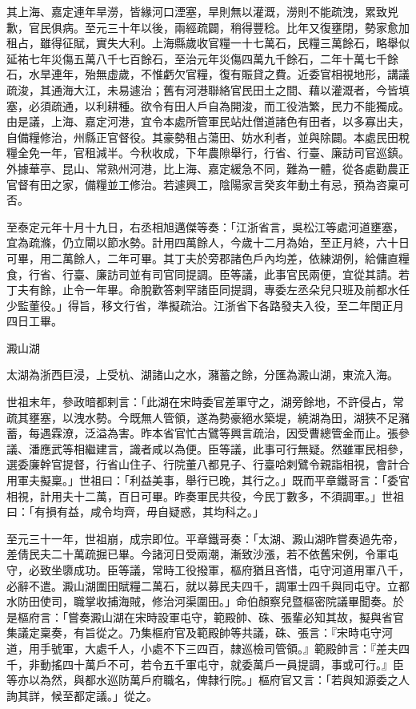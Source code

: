 \begin{pinyinscope}
 其上海、嘉定連年旱澇，皆緣河口湮塞，旱則無以灌溉，澇則不能疏洩，累致兇歉，官民俱病。至元三十年以後，兩經疏闢，稍得豐稔。比年又復壅閉，勢家愈加租占，雖得征賦，實失大利。上海縣歲收官糧一十七萬石，民糧三萬餘石，略舉似延祐七年災傷五萬八千七百餘石，至治元年災傷四萬九千餘石，二年十萬七千餘石，水旱連年，殆無虛歲，不惟虧欠官糧，復有賑貸之費。近委官相視地形，講議疏浚，其通海大江，未易遽治；舊有河港聯絡官民田土之間、藉以灌溉者，今皆填塞，必須疏通，以利耕種。欲令有田人戶自為開浚，而工役浩繁，民力不能獨成。由是議，上海、嘉定河港，宜令本處所管軍民站灶僧道諸色有田者，以多寡出夫，自備糧修治，州縣正官督役。其豪勢租占蕩田、妨水利者，並與除闢。本處民田稅糧全免一年，官租減半。今秋收成，下年農隙舉行，行省、行臺、廉訪司官巡鎮。外據華亭、昆山、常熟州河港，比上海、嘉定緩急不同，難為一體，從各處勸農正官督有田之家，備糧並工修治。若遽興工，陰陽家言癸亥年動土有忌，預為咨稟可否。



 至泰定元年十月十九日，右丞相旭邁傑等奏：「江浙省言，吳松江等處河道壅塞，宜為疏滌，仍立閘以節水勢。計用四萬餘人，今歲十二月為始，至正月終，六十日可畢，用二萬餘人，二年可畢。其丁夫於旁郡諸色戶內均差，依練湖例，給傭直糧食，行省、行臺、廉訪司並有司官同提調。臣等議，此事官民兩便，宜從其請。若丁夫有餘，止令一年畢。命脫歡答剌罕諸臣同提調，專委左丞朵兒只班及前都水任少監董役。」得旨，移文行省，準擬疏治。江浙省下各路發夫入役，至二年閏正月四日工畢。



 澱山湖



 太湖為浙西巨浸，上受杭、湖諸山之水，瀦蓄之餘，分匯為澱山湖，東流入海。



 世祖末年，參政暗都剌言：「此湖在宋時委官差軍守之，湖旁餘地，不許侵占，常疏其壅塞，以洩水勢。今既無人管領，遂為勢豪絕水築堤，繞湖為田，湖狹不足瀦蓄，每遇霖潦，泛溢為害。昨本省官忙古鷿等興言疏治，因受曹總管金而止。張參議、潘應武等相繼建言，識者咸以為便。臣等議，此事可行無疑。然雖軍民相參，選委廉幹官提督，行省山住子、行院董八都見子、行臺哈剌鷿令親詣相視，會計合用軍夫擬稟。」世祖曰：「利益美事，舉行已晚，其行之。」既而平章鐵哥言：「委官相視，計用夫十二萬，百日可畢。昨奏軍民共役，今民丁數多，不須調軍。」世祖曰：「有損有益，咸令均齊，毋自疑惑，其均科之。」



 至元三十一年，世祖崩，成宗即位。平章鐵哥奏：「太湖、澱山湖昨嘗奏過先帝，差倩民夫二十萬疏掘已畢。今諸河日受兩潮，漸致沙漲，若不依舊宋例，令軍屯守，必致坐隳成功。臣等議，常時工役撥軍，樞府猶且吝惜，屯守河道用軍八千，必辭不遣。澱山湖圍田賦糧二萬石，就以募民夫四千，調軍士四千與同屯守。立都水防田使司，職掌收捕海賊，修治河渠圍田。」命伯顏察兒暨樞密院議畢聞奏。於是樞府言：「嘗奏澱山湖在宋時設軍屯守，範殿帥、硃、張輩必知其故，擬與省官集議定稟奏，有旨從之。乃集樞府官及範殿帥等共議，硃、張言：『宋時屯守河道，用手號軍，大處千人，小處不下三四百，隸巡檢司管領。』範殿帥言：『差夫四千，非動搖四十萬戶不可，若令五千軍屯守，就委萬戶一員提調，事或可行。』臣等亦以為然，與都水巡防萬戶府職名，俾隸行院。」樞府官又言：「若與知源委之人詢其詳，候至都定議。」從之。




\end{pinyinscope}

